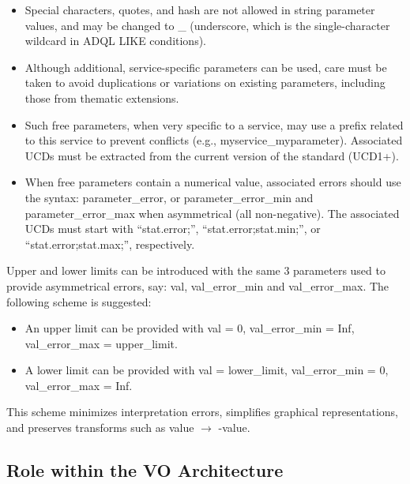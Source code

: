 \documentclass[11pt,a4paper]{ivoa}
\begin{document}
\begin{itemize}
\begin{itemize}
\item Special characters, quotes, and hash are not allowed in string parameter values,
and may be changed to \_ (underscore, which is the single-character
wildcard in ADQL LIKE conditions).

\item Although additional, service-specific parameters can be used,
care must be taken to avoid duplications or variations on existing parameters,
including those from thematic extensions.

\item Such free parameters, when very specific to a service,
may use a prefix related to this service to prevent conflicts
(e.g., myservice\_myparameter).
Associated UCDs must be extracted from the
current version of the standard (UCD1+).

\item When free parameters contain a numerical value, associated errors
should use the syntax: parameter\_error, or parameter\_error\_min
and parameter\_error\_max when asymmetrical (all non-negative). The
associated UCDs must start with ``stat.error;'', ``stat.error;stat.min;'',
or ``stat.error;stat.max;'', respectively.
\end{itemize}

Upper and lower limits can be introduced with the same 3 parameters
used to provide asymmetrical errors, say: val, val\_error\_min and
val\_error\_max. The following scheme is suggested:

\begin{itemize}
\item An upper limit can be provided with val = 0, val\_error\_min = Inf,
val\_error\_max = upper\_limit.

\item A lower limit can be provided with val = lower\_limit,
val\_error\_min = 0, val\_error\_max = Inf.
\end{itemize}

This scheme minimizes interpretation errors, simplifies graphical
representations, and preserves transforms such as value $\to$ -value.

\end{itemize}



\subsection{Role within the VO Architecture}
\end{document}
